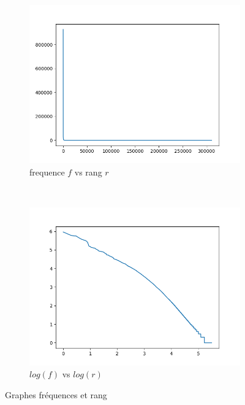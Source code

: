 \documentclass[12pt,a4paper]{article}
\begin{document}
\begin{figure}[htbp]
\centering
\begin{subfigure}[b]{0.45\textwidth}
	\centering \includegraphics[width=\textwidth]{freq_vs_rg_CS276.png}
	\caption{frequence $f$ vs rang $r$}
	\label{fig:CS276_fvsr}
	\end{subfigure}
~
\begin{subfigure}[b]{0.45\textwidth}
	\centering \includegraphics[width=\textwidth]{logFreq_vs_logRg_CS276.png}
	\caption{$log(f)$ vs $log(r)$}
	\label{fig:CS276_logfvslogr}
	\end{subfigure}
\caption{Graphes fréquences et rang}
\end{figure}
\end{document}
